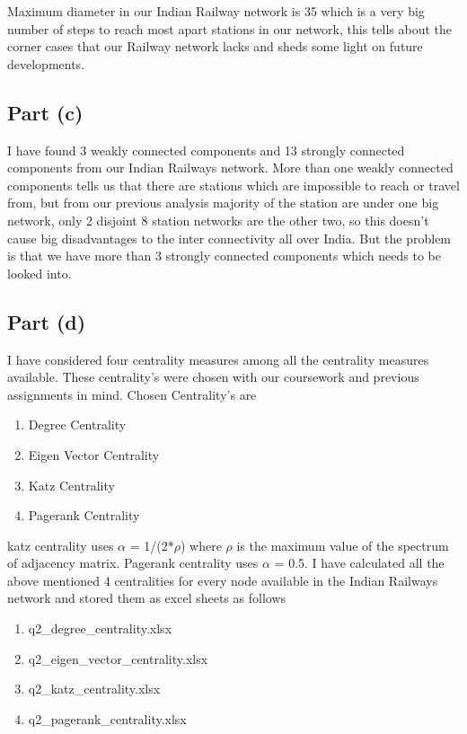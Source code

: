 \documentclass[conference]{IEEEtran}
\begin{document}
Maximum diameter in our Indian Railway network is 35 which is a very big number of steps to reach most apart stations in our network, this tells about the corner cases that our Railway network lacks and sheds some light on future developments.

\subsection{Part (c)}
I have found 3 weakly connected components and 13 strongly connected components from our Indian Railways network. More than one weakly connected components tells us that there are stations which are impossible to reach or travel from, but from our previous analysis majority of the station are under one big network, only 2 disjoint 8 station networks are the other two, so this doesn't cause big disadvantages to the inter connectivity all over India. But the problem is that we have more than 3 strongly connected components which needs to be looked into.

\subsection{Part (d)}
I have considered four centrality measures among all the centrality measures available. These centrality's were chosen with our coursework and previous assignments in mind. Chosen Centrality's are

\begin{enumerate}
\item Degree Centrality
\item Eigen Vector Centrality
\item Katz Centrality
\item Pagerank Centrality
\end{enumerate}
katz centrality uses $\alpha$ = 1/(2*$\rho$) where $\rho$ is the maximum value of the spectrum of adjacency matrix. Pagerank centrality uses $\alpha$ = 0.5.
I have calculated all the above mentioned 4 centralities for every node available in the Indian Railways network and stored them as excel sheets as follows 
\begin{enumerate}
\item q2\_degree\_centrality.xlsx
\item q2\_eigen\_vector\_centrality.xlsx
\item q2\_katz\_centrality.xlsx
\item q2\_pagerank\_centrality.xlsx
\end{enumerate}
\end{document}
